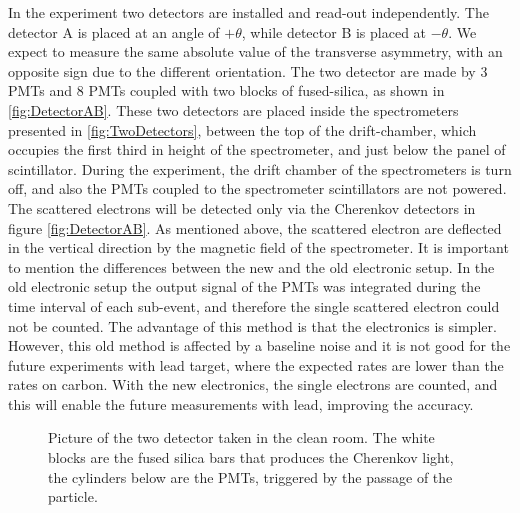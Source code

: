 In the experiment two detectors are installed and read-out independently. The detector A is placed at an angle of $+\theta$, while detector B is placed at $-\theta$. We expect to measure the same absolute value of the transverse asymmetry, with an opposite sign due to the different orientation. 
The two detector are made by 3 PMTs and 8 PMTs coupled with two blocks of fused-silica, as shown in \ref{fig:DetectorAB}.
These two detectors are placed inside the spectrometers presented in \ref{fig:TwoDetectors}, between the top of the drift-chamber, which occupies the first third in height of the spectrometer, and just below the panel of scintillator. During the experiment, the drift chamber of the spectrometers is turn off, and also the PMTs coupled to the spectrometer scintillators are not powered. The scattered electrons will be detected only via the Cherenkov detectors in figure \ref{fig:DetectorAB}.
As mentioned above, the scattered electron are deflected in the vertical direction by the magnetic field of the spectrometer. It is important to mention the differences between the new and the old electronic setup. In the old electronic setup the output signal of the PMTs was integrated during the time interval of each sub-event, and therefore the single scattered electron could not be counted. The advantage of this method is that the electronics is simpler. However, this old method is affected by a baseline noise and it is not good for the future experiments with lead target, where the expected rates are lower than the rates on carbon.
With the new electronics, the single electrons are counted, and this will enable the future measurements with lead, improving the accuracy. 

\begin{figure}[hbtp]
\centering
{} \quad
{} \quad
	\label{fig:Detectors}
\caption{Picture of the two detector taken in the clean room. The white blocks are the fused silica bars that produces the Cherenkov light, the cylinders below are the PMTs, triggered by the passage of the particle. }
\end{figure}

